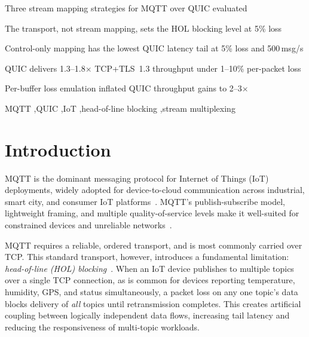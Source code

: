 \documentclass[a4paper,fleqn]{cas-dc}
\begin{document}
\begin{highlights}
\item Three stream mapping strategies for MQTT over QUIC evaluated
\item The transport, not stream mapping, sets the HOL blocking level at 5\% loss
\item Control-only mapping has the lowest QUIC latency tail at 5\% loss and 500\,msg/s
\item QUIC delivers 1.3--1.8$\times$ TCP+TLS~1.3 throughput under 1--10\% per-packet loss
\item Per-buffer loss emulation inflated QUIC throughput gains to 2--3$\times$
\end{highlights}

\begin{keywords}
MQTT \sep QUIC \sep IoT \sep head-of-line blocking \sep stream multiplexing
\end{keywords}

\maketitle


\section{Introduction}
\label{sec:introduction}

MQTT is the dominant messaging protocol for Internet of Things (IoT) deployments, widely adopted for device-to-cloud communication across industrial, smart city, and consumer IoT platforms~\cite{mishra2020mqtt-survey}. MQTT's publish-subscribe model, lightweight framing, and multiple quality-of-service levels make it well-suited for constrained devices and unreliable networks~\cite{mqtt-v5-spec}.

MQTT requires a reliable, ordered transport, and is most commonly carried over TCP. This standard transport, however, introduces a fundamental limitation: \emph{head-of-line (HOL) blocking}~\cite{scharf2006hol}. When an IoT device publishes to multiple topics over a single TCP connection, as is common for devices reporting temperature, humidity, GPS, and status simultaneously, a packet loss on any one topic's data blocks delivery of \emph{all} topics until retransmission completes. This creates artificial coupling between logically independent data flows, increasing tail latency and reducing the responsiveness of multi-topic workloads.
\end{document}
